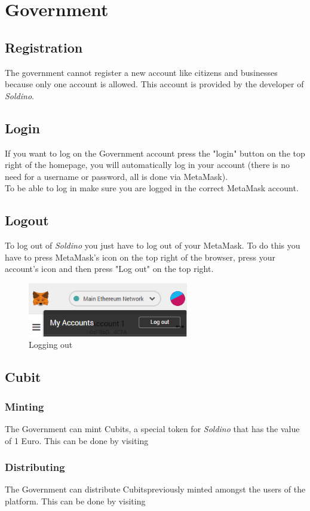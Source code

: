 \section{Government}
	\subsection{Registration}
	The government cannot register a new account like citizens and 
	businesses because only one account is allowed. This account is provided 
	by the developer of \textit{Soldino}.
	\subsection{Login}
	If you want to log on the Government account press the "login" button on the 
	top right of the homepage, you will automatically log in your account 
	(there is no need for a username or password, all is done via MetaMask). 
	\\To be able to log in make sure you are logged in the correct MetaMask\glosp 
	account.
	\subsection{Logout}
	To log out of \textit{Soldino} you just have to log out of 
	your MetaMask\glosp. To do this you have to press MetaMask's icon on the top 
	right of the browser, press your account's icon and then press "Log out"
	on the top right.
	\begin{figure}[H]
		\includegraphics[width=7cm]{res/images/logout_metamask.png}
		\centering
		\caption{Logging out}
	\end{figure}
	\subsection{Cubit}
		\subsubsection{Minting}
		The Government can mint Cubits\glo, a special token for \textit{Soldino} 
		that has the value of 1 Euro. This can be done by visiting 
%		
		\subsubsection{Distributing}
		The Government can distribute Cubits\glosp previously minted amongst the users 
		of the platform. This can be done by visiting 
%		
